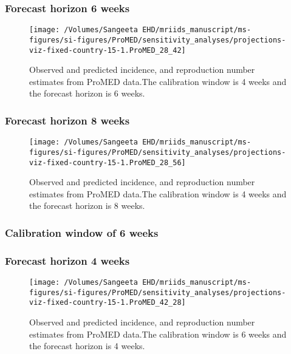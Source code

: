 \documentclass[9pt,twoside,lineno]{pnas-new}
\begin{document}
\hypertarget{forecast-horizon-6-weeks-10}{%
  \subsubsection{Forecast horizon 6 weeks}\label{forecast-horizon-6-weeks-10}}

\begin{figure}

  {\centering \texttt{[image: /Volumes/Sangeeta EHD/mriids\_manuscript/ms-figures/si-figures/ProMED/sensitivity\_analyses/projections-viz-fixed-country-15-1.ProMED\_28\_42]} 

  }

  \caption{Observed and predicted incidence, and reproduction number
    estimates from ProMED data.The calibration window is 4 weeks and
    the forecast horizon is 6 weeks.}
  \label{fig:pm46gamma}
\end{figure}

\hypertarget{forecast-horizon-8-weeks-10}{%
  \subsubsection{Forecast horizon 8 weeks}\label{forecast-horizon-8-weeks-10}}

\begin{figure}

  {
    \centering
    \texttt{[image: /Volumes/Sangeeta EHD/mriids\_manuscript/ms-figures/si-figures/ProMED/sensitivity\_analyses/projections-viz-fixed-country-15-1.ProMED\_28\_56]} 
  }
  \caption{Observed and predicted incidence, and reproduction number
    estimates from ProMED data.The calibration window is 4 weeks and
    the forecast horizon is 8 weeks.}
  \label{fig:pm48gamma}
\end{figure}

\hypertarget{calibration-window-of-6-weeks-3}{%
  \subsubsection{Calibration window of 6 weeks}\label{calibration-window-of-6-weeks-3}}

\hypertarget{forecast-horizon-4-weeks-10}{%
  \subsubsection{Forecast horizon 4 weeks}\label{forecast-horizon-4-weeks-10}}

\begin{figure}

  {
    \centering \texttt{[image: /Volumes/Sangeeta EHD/mriids\_manuscript/ms-figures/si-figures/ProMED/sensitivity\_analyses/projections-viz-fixed-country-15-1.ProMED\_42\_28]} 

  }

  \caption{Observed and predicted incidence, and reproduction number
    estimates from ProMED data.The calibration window is 6 weeks and
    the forecast horizon is 4 weeks.}
  \label{fig:pm64gamma }
\end{figure}
\end{document}
